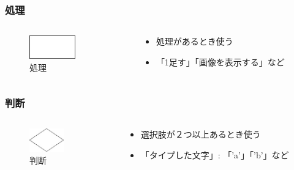 \documentclass[10pt, dvipdfmx]{beamer}
\begin{document}
        \begin{frame}
            \frametitle{処理}
            \begin{columns}[c]
                \begin{column}{0.50\textwidth}
                    \begin{figure}[htb]
                        \includegraphics[height=10mm]{images/processing.jpg}
                        \caption{処理}
                        \label{fig:07}
                    \end{figure}
                \end{column}
                \begin{column}{0.50\textwidth}
                    \begin{block}{}
                        \begin{itemize}
                            \item 処理があるとき使う
                            \item 「1足す」「画像を表示する」など
                        \end{itemize}
                    \end{block}
                \end{column}
            \end{columns}
        \end{frame}

        \begin{frame}
            \frametitle{判断}
            \begin{columns}[c]
                \begin{column}{0.50\textwidth}
                    \begin{figure}[htb]
                        \includegraphics[height=10mm]{images/judge.jpg}
                        \caption{判断}
                        \label{fig:08}
                    \end{figure}
                \end{column}
                \begin{column}{0.50\textwidth}
                    \begin{block}{}
                        \begin{itemize}
                            \item 選択肢が２つ以上あるとき使う
                            \item 「タイプした文字」: 「'a'」「'b'」など
                        \end{itemize}
                    \end{block}
                \end{column}
            \end{columns}
        \end{frame}
\end{document}
